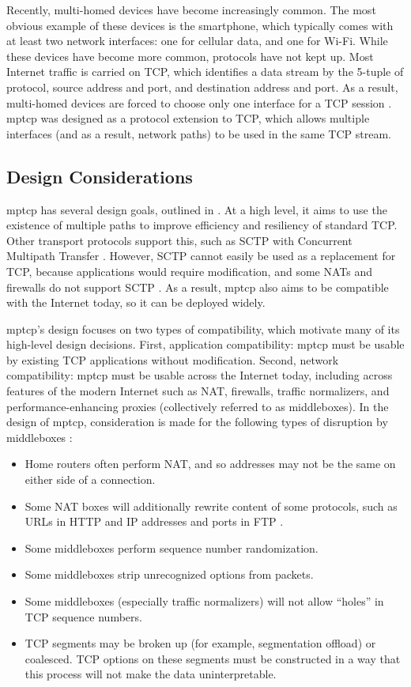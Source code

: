\documentclass{cwru}
\begin{document}
Recently, multi-homed devices have become increasingly common. The most obvious
example of these devices is the smartphone, which typically comes with at least
two network interfaces: one for cellular data, and one for Wi-Fi. While these
devices have become more common, protocols have not kept up. Most Internet
traffic is carried on TCP, which identifies a data stream by the 5-tuple of
protocol, source address and port, and destination address and port. As a
result, multi-homed devices are forced to choose only one interface for a TCP
session \cite{raiciu2012hard}. \ac{mptcp} was designed as a protocol extension
to TCP, which allows multiple interfaces (and as a result, network paths) to be
used in the same TCP stream.

\subsection{Design Considerations}

\ac{mptcp} has several design goals, outlined in \cite{rfc6182}. At a high
level, it aims to use the existence of multiple paths to improve efficiency and
resiliency of standard TCP. Other transport protocols support this, such as SCTP
with Concurrent Multipath Transfer \cite{iyengar2006concurrent}. However, SCTP
cannot easily be used as a replacement for TCP, because applications would
require modification, and some NATs and firewalls do not support SCTP
\cite{barre2011multipath}. As a result, \ac{mptcp} also aims to be compatible
with the Internet today, so it can be deployed widely.

\ac{mptcp}'s design focuses on two types of compatibility, which motivate many
of its high-level design decisions. First, application compatibility: \ac{mptcp}
must be usable by existing TCP applications without modification. Second,
network compatibility: \ac{mptcp} must be usable across the Internet today,
including across features of the modern Internet such as NAT, firewalls, traffic
normalizers, and performance-enhancing proxies (collectively referred to as
middleboxes). In the design of \ac{mptcp}, consideration is made for the
following types of disruption by middleboxes \cite{rfc6182}:

\begin{itemize}
\item Home routers often perform NAT, and so addresses may not be the same on
  either side of a connection.
\item Some NAT boxes will additionally rewrite content of some protocols, such
  as URLs in HTTP \cite{rfc6182} and IP addresses and ports in FTP
  \cite{raiciu2012hard}.
\item Some middleboxes perform sequence number randomization.
\item Some middleboxes strip unrecognized options from packets.
\item Some middleboxes (especially traffic normalizers) will not allow ``holes''
  in TCP sequence numbers.
\item TCP segments may be broken up (for example, segmentation offload) or
  coalesced. TCP options on these segments must be constructed in a way that
  this process will not make the data uninterpretable.
\end{itemize}
\end{document}
